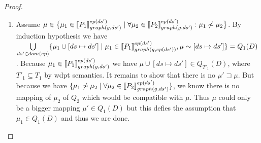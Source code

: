 \begin{proof}
\begin{enumerate}
\begin{enumerate}
				\item Assume $\mu \in \big\{ \mu_1 \in  \llbracket P_1 \rrbracket^{ep(ds')}_{graph(g,ds')} \mid 
						\forall \mu_2 \in \llbracket P_2 \rrbracket^{ep(ds')}_{graph(g,ds')}: 
					\mu_1 \not\sim \mu_2 \big\}$. 
					By induction hypothesis we have \\
					$\bigcup\limits_{ds' \in dom(ep)} \{ \mu_1 \cup	[ds	\mapsto ds'] 
						\mid \mu_1 \in \llbracket	P_1\rrbracket^{ep(ds')}_{graph(g,ep(ds'))}, \mu \sim
					[ds\mapsto ds'] \}  = Q_1(D)$.
					Because $\mu_1 \in \llbracket P_1
					\rrbracket^{ep(ds')}_{graph(g,ds')}$ 
					we have $\mu\cup [ds \mapsto ds'] \in Q_{T'_1}(D)$, where
					$T'_1 \subseteq T_1$ by wdpt semantics.
					It remains to show that there
					is no $\mu' \sqsupset \mu$. But because we have $\{\mu_1 \not\sim \mu_2 \mid
					\forall \mu_2 \in \llbracket P_2 \rrbracket^{ep(ds')}_{graph(g,ds')} \}$, 
					we know there is no mapping
					of $\mu_2$ of $Q_2$ which would be compatible with $\mu$. Thus $\mu$ could
					only be a bigger mapping $\mu' \in Q_1(D)$ but this defies the
					assumption that $\mu_1 \in Q_1(D)$ and thus we are done.
			\end{enumerate}


\end{enumerate}
\end{proof}
